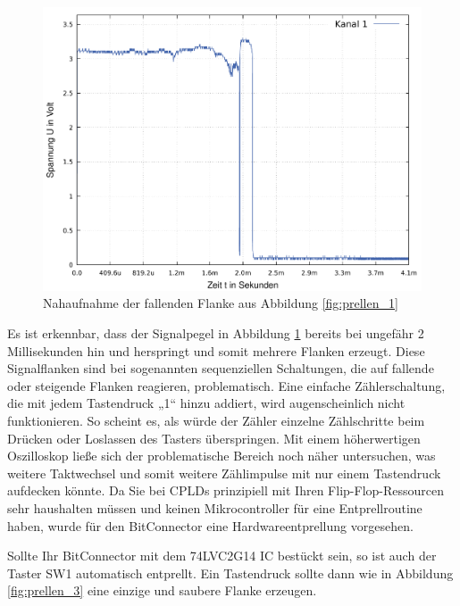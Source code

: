 \documentclass{article}
\begin{document}
{\begin{figure}[!h]
	\centering
	\includegraphics[width=0.92\linewidth]{Figures/bounce_near}
	\caption{Nahaufnahme der fallenden Flanke aus Abbildung \ref{fig:prellen_1}}
	\label{fig:prellen_2}
\end{figure}

Es ist erkennbar, dass der Signalpegel in Abbildung \ref{fig:prellen_2} bereits bei ungefähr 2 Millisekunden hin und herspringt und somit mehrere Flanken erzeugt. Diese Signalflanken sind bei sogenannten sequenziellen Schaltungen, die auf fallende oder steigende Flanken reagieren, problematisch. Eine einfache Zählerschaltung, die mit jedem Tastendruck „1“ hinzu addiert, wird augenscheinlich nicht funktionieren. So scheint es, als würde der Zähler einzelne Zählschritte beim Drücken oder Loslassen des Tasters überspringen. Mit einem höherwertigen Oszilloskop ließe sich der problematische Bereich noch näher untersuchen, was weitere Taktwechsel und somit weitere Zählimpulse mit nur einem Tastendruck aufdecken könnte. 
Da Sie bei CPLDs prinzipiell mit Ihren Flip-Flop-Ressourcen sehr haushalten müssen und keinen Mikrocontroller für eine Entprellroutine haben, wurde für den BitConnector eine Hardwareentprellung vorgesehen. 

\newpage

Sollte Ihr BitConnector mit dem 74LVC2G14 IC bestückt sein, so ist auch der Taster SW1 automatisch entprellt. Ein Tastendruck sollte dann wie in Abbildung \ref{fig:prellen_3} eine einzige und saubere Flanke erzeugen. 


}
\end{document}
